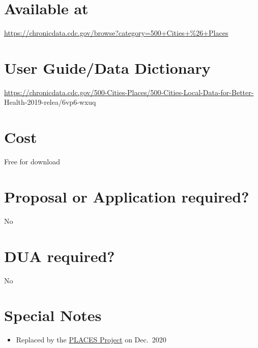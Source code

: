 \documentclass[
]{book}
\providecommand{\tightlist}{%
  \setlength{\itemsep}{0pt}\setlength{\parskip}{0pt}}
\begin{document}
\hypertarget{available-at-98}{%
\section{Available at}\label{available-at-98}}

\url{https://chronicdata.cdc.gov/browse?category=500+Cities+\%26+Places}

\hypertarget{user-guidedata-dictionary-98}{%
\section{User Guide/Data Dictionary}\label{user-guidedata-dictionary-98}}

\url{https://chronicdata.cdc.gov/500-Cities-Places/500-Cities-Local-Data-for-Better-} Health-2019-relea/6vp6-wxuq

\hypertarget{cost-98}{%
\section{Cost}\label{cost-98}}

Free for download

\hypertarget{proposal-or-application-required-98}{%
\section{Proposal or Application required?}\label{proposal-or-application-required-98}}

No

\hypertarget{dua-required-98}{%
\section{DUA required?}\label{dua-required-98}}

No

\hypertarget{special-notes-98}{%
\section{Special Notes}\label{special-notes-98}}

\begin{itemize}
\tightlist
\item
  Replaced by the \href{https://cu-anschutz-dos-corp.github.io/researchDatabases/places-local-data-for-better-health.html}{PLACES Project} on Dec.~2020
\end{itemize}

  
\end{document}
